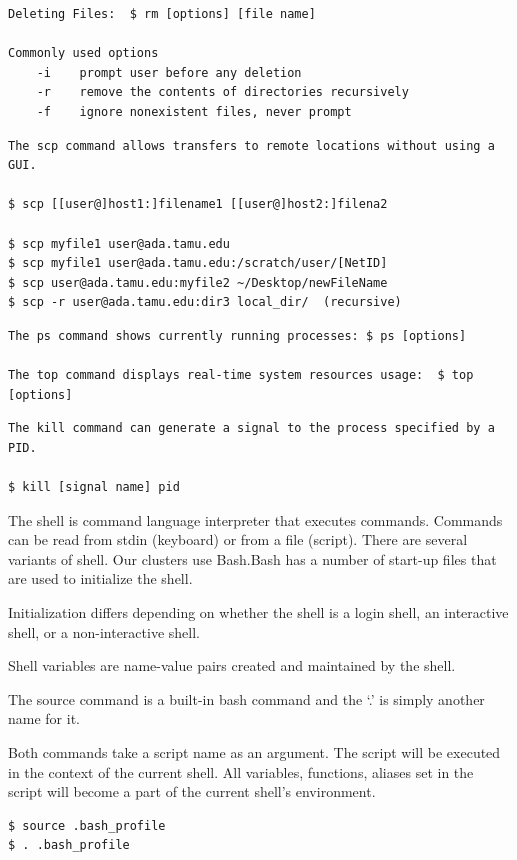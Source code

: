 \begin{verbatim}
Deleting Files:  $ rm [options] [file name]

Commonly used options
	-i    prompt user before any deletion
	-r    remove the contents of directories recursively
	-f    ignore nonexistent files, never prompt
\end{verbatim}

\begin{Verbatim}
The scp command allows transfers to remote locations without using a GUI. 

$ scp [[user@]host1:]filename1 [[user@]host2:]filena2

$ scp myfile1 user@ada.tamu.edu
$ scp myfile1 user@ada.tamu.edu:/scratch/user/[NetID]
$ scp user@ada.tamu.edu:myfile2 ~/Desktop/newFileName
$ scp -r user@ada.tamu.edu:dir3 local_dir/  (recursive) 
\end{Verbatim}

\begin{verbatim}
The ps command shows currently running processes: $ ps [options]

The top command displays real-time system resources usage:  $ top [options]
\end{verbatim}


\begin{verbatim}
The kill command can generate a signal to the process specified by a PID.

$ kill [signal name] pid

\end{verbatim}

The shell is command language interpreter that executes commands. Commands can be read from stdin (keyboard) or from a file (script). There are several variants of shell.  Our clusters use Bash.Bash has a number of start-up files that are used to initialize the shell.

Initialization differs depending on whether the shell is a login shell, an interactive shell, or a non-interactive shell.

Shell variables are name-value pairs created and maintained by the shell.

The source command is a built-in bash command and the ‘.’ is simply another name for it.

Both commands take a script name as an argument.  The script will be executed in the context of the current shell.  All variables, functions, aliases set in the script will become a part of the current shell’s environment.
\begin{verbatim}
$ source .bash_profile
$ . .bash_profile
\end{verbatim}


